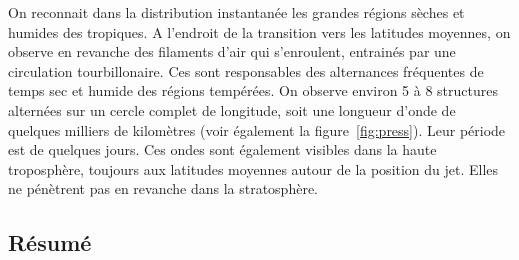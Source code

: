 
\sk
On reconnait dans la distribution instantanée les grandes régions sèches et humides des tropiques. A l'endroit de la transition vers les latitudes moyennes, on observe en revanche des filaments d'air qui s'enroulent, entrainés par une circulation tourbillonaire. Ces  sont responsables des alternances fréquentes de temps sec et humide des régions tempérées. On observe environ 5 à 8 structures alternées sur un cercle complet de longitude, soit une longueur d'onde de quelques milliers de kilomètres (voir également la figure~\ref{fig:press}). Leur période est de quelques jours. Ces ondes sont également visibles dans la haute troposphère, toujours aux latitudes moyennes 
autour de la position du jet. Elles ne pénètrent pas en revanche dans la stratosphère.


\sk
\subsection{Résumé}

